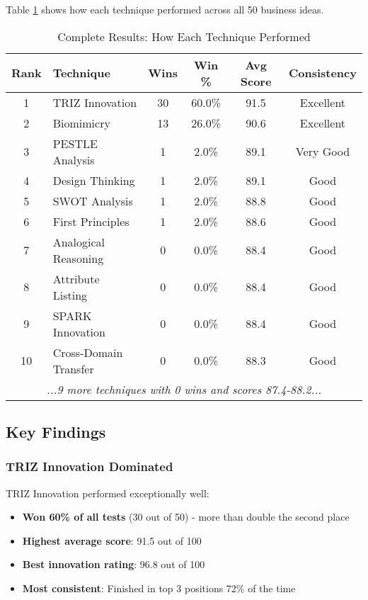 \documentclass[12pt]{article}
\begin{document}
Table \ref{tab:performance} shows how each technique performed across all 50 business ideas.

\begin{table}[H]
\centering
\caption{Complete Results: How Each Technique Performed}
\label{tab:performance}
\begin{tabular}{@{}clcccc@{}}
\toprule
Rank & Technique & Wins & Win \% & Avg Score & Consistency \\
\midrule
1 & TRIZ Innovation & 30 & 60.0\% & 91.5 & Excellent \\
2 & Biomimicry & 13 & 26.0\% & 90.6 & Excellent \\
3 & PESTLE Analysis & 1 & 2.0\% & 89.1 & Very Good \\
4 & Design Thinking & 1 & 2.0\% & 89.1 & Good \\
5 & SWOT Analysis & 1 & 2.0\% & 88.8 & Good \\
6 & First Principles & 1 & 2.0\% & 88.6 & Good \\
7 & Analogical Reasoning & 0 & 0.0\% & 88.4 & Good \\
8 & Attribute Listing & 0 & 0.0\% & 88.4 & Good \\
9 & SPARK Innovation & 0 & 0.0\% & 88.4 & Good \\
10 & Cross-Domain Transfer & 0 & 0.0\% & 88.3 & Good \\
\midrule
\multicolumn{6}{c}{\textit{...9 more techniques with 0 wins and scores 87.4-88.2...}} \\
\bottomrule
\end{tabular}
\end{table}

\subsection{Key Findings}

\subsubsection{TRIZ Innovation Dominated}

TRIZ Innovation performed exceptionally well:
\begin{itemize}
\item \textbf{Won 60\% of all tests} (30 out of 50) - more than double the second place
\item \textbf{Highest average score}: 91.5 out of 100
\item \textbf{Best innovation rating}: 96.8 out of 100
\item \textbf{Most consistent}: Finished in top 3 positions 72\% of the time
\end{itemize}
\end{document}
